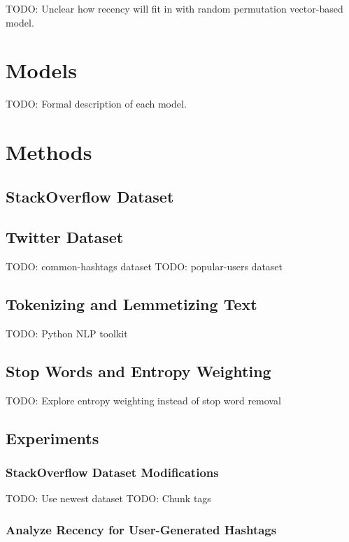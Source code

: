 \documentclass[man]{apa6}
\begin{document}
TODO: Unclear how recency will fit in with random permutation vector-based model.

\section{Models}

TODO: Formal description of each model.

\section{Methods}

\subsection{StackOverflow Dataset}

\cite{DataDump2013}

\subsection{Twitter Dataset}

TODO: common-hashtags dataset
TODO: popular-users dataset

\subsection{Tokenizing and Lemmetizing Text}

TODO: Python NLP toolkit \cite{Bird2009}

\subsection{Stop Words and Entropy Weighting}

TODO: Explore entropy weighting instead of stop word removal \cite{Dumais1991}

\subsection{Experiments}

\subsubsection{StackOverflow Dataset Modifications}

TODO: Use newest dataset
TODO: Chunk tags

\subsubsection{Analyze Recency for User-Generated Hashtags}
\end{document}
